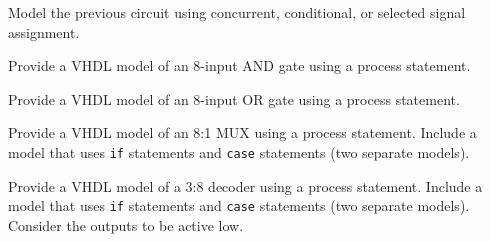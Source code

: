 \begin{my_num_list}
\item Model the previous circuit using concurrent, conditional, or selected signal assignment.
\item Provide a VHDL model of an 8-input AND gate using a process statement.
\item Provide a VHDL model of an 8-input OR gate using a process statement.
\item Provide a VHDL model of an 8:1 MUX using a process statement. Include a model that uses \texttt{if} statements and \texttt{case} statements (two separate models).
\item Provide a VHDL model of a 3:8 decoder using a process statement. Include a model that uses \texttt{if} statements and \texttt{case} statements (two separate models). Consider the outputs to be active low.
\end{my_num_list}
